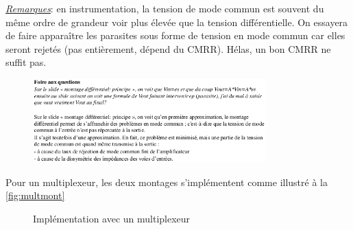 \underline{\textit{Remarques}}: en instrumentation, la tension de mode commun est souvent du même ordre de grandeur  voir plus élevée que la tension différentielle. On essayera de faire apparaître les parasites sous forme de tension en mode commun car elles seront rejetés (pas entièrement, dépend du CMRR). Hélas, un bon CMRR ne suffit pas.
\begin{figure}[H] 
	\centering 
	\includegraphics[width=0.8\textwidth,height=10\baselineskip,keepaspectratio]{ch3/image14} 
\end{figure}
Pour un multiplexeur, les deux montages s'implémentent comme illustré à la \autoref{fig:multmont}
\begin{figure}[H]
	\centering
	\caption{Implémentation avec un multiplexeur}
	\label{fig:multmont}
\end{figure}
